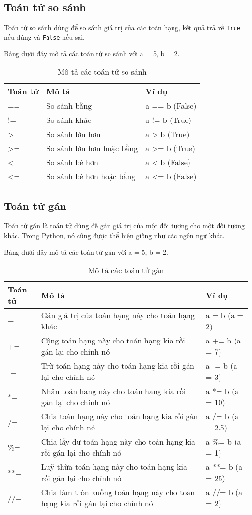 \subsection{Toán tử so sánh}
Toán tử so sánh dùng để so sánh giá trị của các toán hạng, kết quả trả về \texttt{True} nếu đúng và \texttt{False} nếu sai.\par
Bảng dưới đây mô tả các toán tử so sánh với a = 5, b = 2.
\begin{table}[h]
	\centering
	\begin{tabular}{|l||l||l|}
		\hline
		Toán tử & Mô tả & Ví dụ \\
		\hline
		== & So sánh bằng  & a == b (False) \\
		\hline
		!= & So sánh khác & a != b (True) \\
		\hline
		> & So sánh lớn hơn & a > b (True) \\
		\hline
		>= & So sánh lớn hơn hoặc bằng & a >= b (True) \\
		\hline
		< & So sánh bé hơn & a < b (False) \\
		\hline
		<= & So sánh bé hơn hoặc bằng & a <= b (False) \\
		\hline
	\end{tabular}
	\caption{Mô tả các toán tử so sánh}
\end{table}
\newpage
\subsection{Toán tử gán}
Toán tử gán là toán tử dùng đế gán giá trị của một đối tượng cho một đối tượng khác. Trong Python, nó cũng được thể hiện giống như các ngôn ngữ khác.\par
Bảng dưới đây mô tả các toán tử gán với a = 5, b = 2.
\begin{table}[h]
	\centering
	\begin{tabular}{|l||l||l|}
		\hline
		Toán tử & Mô tả & Ví dụ \\
		\hline
		= & Gán giá trị của toán hạng này cho toán hạng khác & a = b (a = 2) \\
		\hline
		+= & Cộng toán hạng này cho toán hạng kia rồi gán lại cho chính nó & a += b (a = 7) \\
		\hline
		-= & Trừ toán hạng này cho toán hạng kia rồi gán lại cho chính nó & a -= b (a = 3) \\
		\hline
		*= & Nhân toán hạng này cho toán hạng kia rồi gán lại cho chính nó & a *= b (a = 10) \\
		\hline
		/= & Chia toán hạng này cho toán hạng kia rồi gán lại cho chính nó & a /= b (a = 2.5) \\
		\hline
		\%= & Chia lấy dư toán hạng này cho toán hạng kia rồi gán lại cho chính nó & a \%= b (a = 1) \\
		\hline
		**= & Luỹ thừa toán hạng này cho toán hạng kia rồi gán lại cho chính nó & a **= b (a = 25) \\
		\hline
		//= & Chia làm tròn xuống toán hạng này cho toán hạng kia rồi gán lại cho chính nó & a //= b (a = 2) \\
		\hline
	\end{tabular}
	\caption{Mô tả các toán tử gán}
\end{table}

